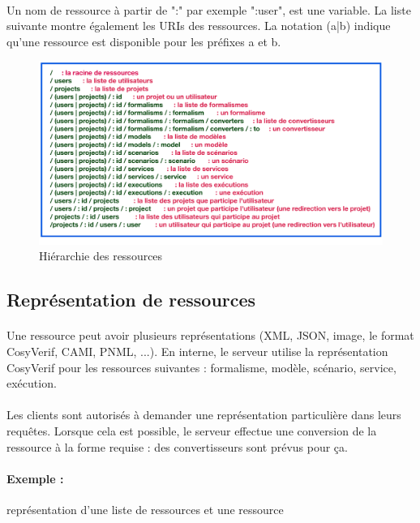 \documentclass{report}
\begin{document}
\paragraph{}
Un nom de ressource à partir de ":" par exemple ":user", est une variable. La liste suivante montre également les URIs des
ressources. La notation (a|b) indique qu'une ressource est disponible pour les préfixes a et b.

\begin{figure}[h!]
    \centering
    \includegraphics[scale=0.60]{img/resources_uri.pdf}
    \caption{Hiérarchie des ressources}
\end{figure}

\subsection{Représentation de ressources}

\paragraph{}
Une ressource peut avoir plusieurs représentations (XML, JSON, image, le format CosyVerif, CAMI, PNML, ...). En interne, 
le serveur utilise la représentation CosyVerif pour les ressources suivantes : formalisme, modèle, scénario, service, 
exécution.

\paragraph{}
Les clients sont autorisés à demander une représentation particulière dans leurs requêtes. Lorsque cela est possible, le 
serveur effectue une conversion de la ressource à la forme requise : des convertisseurs sont prévus pour ça.

\paragraph{Exemple :}
représentation d'une liste de ressources et une ressource
\end{document}
